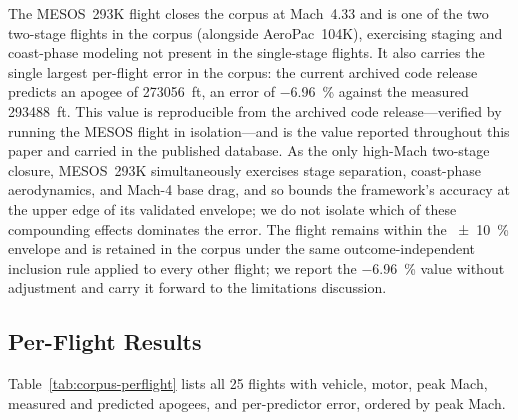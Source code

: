 The MESOS~293K flight closes the corpus at Mach~4.33 and is one of the two
two-stage flights in the corpus (alongside AeroPac~104K), exercising staging and
coast-phase modeling not present in the single-stage flights. It also carries the
single largest per-flight error in the corpus: the current archived code release
predicts an apogee of \SI{273056}{ft}, an error of \SI{-6.96}{\percent} against
the measured \SI{293488}{ft}. This value is reproducible from the archived code
release---verified by running the MESOS flight in isolation---and is the value
reported throughout this paper and carried in the published database. As the only
high-Mach two-stage closure, MESOS~293K simultaneously exercises stage
separation, coast-phase aerodynamics, and Mach-4 base drag, and so bounds the
framework's accuracy at the upper edge of its validated envelope; we do not
isolate which of these compounding effects dominates the error. The flight
remains within the \SI{\pm 10}{\percent} envelope and is retained in the corpus
under the same outcome-independent inclusion rule applied to every other flight;
we report the \SI{-6.96}{\percent} value without adjustment and carry it forward
to the limitations discussion.

\subsection{Per-Flight Results}
\label{sec:corpus-perflight}

Table~\ref{tab:corpus-perflight} lists all \num{25} flights with vehicle, motor,
peak Mach, measured and predicted apogees, and per-predictor error, ordered by
peak Mach.

